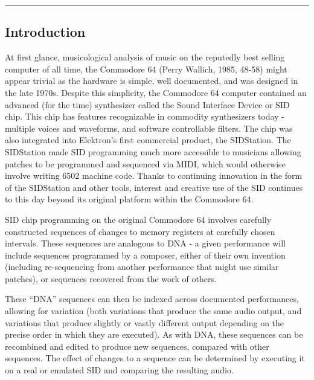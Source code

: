 \documentclass[10pt]{article}
\begin{document}
        \begin{center}
                \rule{150mm}{0.2mm}
        \end{center}

        \vspace{5mm}

\begin{multicols*}{2}

  \section{Introduction}

At first glance, musicological analysis of music on the reputedly best selling computer of all time, the Commodore 64 (Perry Wallich, 1985, 48-58) might appear trivial as the hardware is simple, well documented, and was designed in the late 1970s. Despite this simplicity, the Commodore 64 computer contained an advanced (for the time) synthesizer called the Sound Interface Device\cite{sidpatent} or SID chip. This chip has features recognizable in commodity synthesizers today - multiple voices and waveforms, and software controllable filters. The chip was also integrated into Elektron’s first commercial product, the SIDStation\cite{sidstation}. The SIDStation made SID programming much more accessible to musicians allowing patches to be programmed and sequenced via MIDI, which would otherwise involve writing 6502 machine code. Thanks to continuing innovation in the form of the SIDStation and other tools, interest and creative use of the SID continues to this day beyond its original platform within the Commodore 64.

SID chip programming on the original Commodore 64 involves carefully constructed sequences of changes to memory registers at carefully chosen intervals. These sequences are analogous to DNA - a given performance will include sequences programmed by a composer, either of their own invention (including re-sequencing from another performance that might use similar patches), or sequences recovered from the work of others.

These “DNA” sequences can then be indexed across documented performances, allowing for variation (both variations that produce the same audio output, and variations that produce slightly or vastly different output depending on the precise order in which they are executed). As with DNA, these sequences can be recombined and edited to produce new sequences, compared with other sequences. The effect of changes to a sequence can be determined by executing it on a real or emulated SID and comparing the resulting audio.


\end{multicols*}
\end{document}
